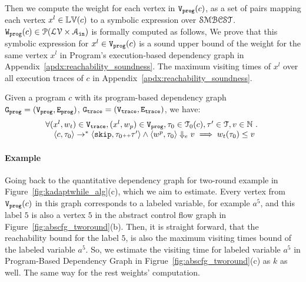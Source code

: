 Then we compute the weight for each vertex in $\mathtt{{V_{prog}}}(c)$,
as a set of pairs 
mapping each vertex $x^l \in \mathbb{LV}(c)$ to a symbolic expression over $\mathcal{SMBCST}$.
$\mathtt{{W_{prog}}}(c) \in \mathcal{P}(\mathcal{LV} \times \mathcal{A}_{\mathtt{in}})$ is formally computed
as follows,
%
We prove that this 
symbolic expression for $x^l \in \mathtt{{V_{prog}}}(c)$ is a sound upper bound of 
the weight for the same vertex $x^l$ in Program's execution-based dependency graph in Appendix~\ref{apdx:reachability_soundness}.
The maximum visiting times of $x^l$ over all execution traces of $c$ in Appendix~\ref{apdx:reachability_soundness}. 
%
\begin{thm}
  \label{thm:vertexweight_soundness}
Given a program ${c}$ with its program-based dependency graph 
$\mathtt{{G_{prog}}} = (\mathtt{{V_{prog}}}, \mathtt{{E_{prog}}})$,
$\mathtt{{G_{trace}}} = (\mathtt{{V_{trace}}}, \mathtt{{E_{trace}}})$, we have:
%
\[
  \begin{array}{l}
  \forall (x^l, w_{t}) \in \mathtt{{V_{trace}}},
  (x^l, w_{p}) \in \mathtt{{V_{prog}}}, 
  \mathtt{\tau}_0 \in \mathcal{T}_0(c), 
  \mathtt{\tau}' \in \mathcal{T}, v \in \mathbb{N} ~.~
  \\ \quad
  \langle {c}, \mathtt{\tau}_0 \rangle \to^{*} \langle \mathtt{skip}, \mathtt{\tau}_0{\scriptscriptstyle ++}\mathtt{\tau}' \rangle 
  \land 
  \langle w^{p}, \mathtt{\tau}_0 \rangle \Downarrow_e v
  \implies
  w_{t}(\mathtt{\tau}_0) \leq v
  \end{array}
\]
\end{thm}
\paragraph*{Example}
Going back to the
quantitative dependency graph for two-round example in
Figure~\ref{fig:kadaptwhile_alg}(c), which we aim to estimate.
%
Every vertex from $\mathtt{{V_{prog}}}(c)$ in this graph corresponds to a labeled variable, for example $a^5$,
and this label $5$ is also a vertex $5$ in the abstract control flow graph in Figure~\ref{fig:abscfg_tworound}(b).
%
Then, it is straight forward, 
that the reachability bound for the label $5$, 
is also the maximum visiting times bound of the labeled variable $a^5$.
So, we estimate the visiting time for  labeled variable $a^5$ in Program-Based Dependency Graph in Figrue~\ref{fig:abscfg_tworound}(c) as $k$ as well.
%
The same way for the rest weights' computation.
%
%
